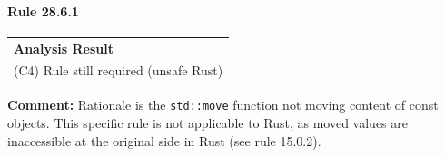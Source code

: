 \paragraph{Rule 28.6.1}
\begin{longtable}{p{13cm}}
\textbf{Analysis Result} \\
(C4) Rule still required (unsafe Rust) \\
\end{longtable}
\textbf{Comment:} Rationale is the \texttt{std::move} function not moving content of const objects. This specific rule is not applicable to Rust, as moved values are inaccessible at the original side in Rust (see rule 15.0.2). \\
